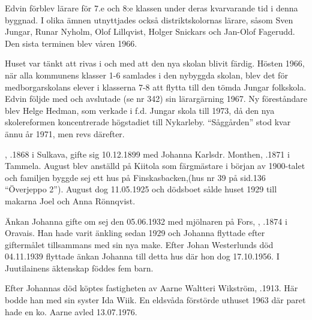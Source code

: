 Edvin förblev lärare för 7.e och  8:e klassen under deras kvarvarande tid i denna byggnad. I olika ämnen utnyttjades också distriktskolornas lärare, såsom Sven Jungar, Runar Nyholm, Olof Lillqvist, Holger Snickars och Jan-Olof Fagerudd. Den sista terminen blev våren 1966.

Huset var tänkt att rivas i och med att den nya skolan blivit färdig. Hösten 1966, när alla kommunens klasser 1-6 samlades i den nybyggda skolan, blev det för medborgarskolans elever i klasserna 7-8 att flytta till den tömda Jungar folkskola. Edvin följde med och avslutade (se nr 342) sin lärargärning 1967. Ny föreståndare blev Helge Hedman, som verkade i f.d. Jungar skola till 1973, då den nya skolereformen koncentrerade högstadiet till Nykarleby. ``Såggården'' stod kvar ännu år 1971, men revs därefter.



%



%
, .1868 i Sulkava, gifte sig 10.12.1899 med Johanna Karlsdr. Monthen, .1871 i Tammela. August blev anställd på Kiitola som färgmästare i början av 1900-talet och familjen byggde sej ett hus på Finskasbacken,(hus nr 39 på sid.136 ``Överjeppo 2''). August dog 11.05.1925 och dödsboet sålde huset 1929 till makarna Joel och Anna Rönnqvist.

Änkan Johanna gifte om sej den 05.06.1932 med mjölnaren på Fors, , .1874 i Oravais. Han hade varit änkling sedan 1929 och Johanna flyttade efter giftermålet tillsammans med sin nya make. Efter Johan Westerlunds död 04.11.1939 flyttade änkan Johanna till detta hus där hon dog 17.10.1956. I Juutilainens äktenskap föddes fem barn.
\begin{jhchildren}
  \item {}
  \item {}
  \item {}
  \item {}
  \item {}
\end{jhchildren}
Efter Johannas död köptes fastigheten av Aarne Waltteri Wikström, .1913. Här bodde han med sin syster Ida Wiik. En eldsvåda förstörde uthuset 1963 där paret hade en ko. Aarne avled 13.07.1976.

